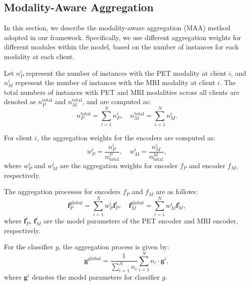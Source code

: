 \subsection{Modality-Aware Aggregation}

In this section, we describe the modality-aware aggregation (MAA) method adopted in our framework. Specifically, we use different aggregation weights for different modules within the model, based on the number of instances for each modality at each client.

Let \( n_P^i \) represent the number of instances with the PET modality at client \( i \), and \( n_M^i \) represent the number of instances with the MRI modality at client \( i \). The total numbers of instances with PET and MRI modalities across all clients are denoted as \( n^{\text{total}}_P \) and \( n^{\text{total}}_M \), and are computed as:
\begin{equation}
n^{\text{total}}_P = \sum_{i=1}^{N} n_P^i, \quad n^{\text{total}}_M = \sum_{i=1}^{N} n_M^i.    
\end{equation}

For client \( i \), the aggregation weights for the encoders are computed as:
\begin{equation}
w_P^i = \frac{n_P^i}{n_{\text{total}}^P}, \quad w_M^i = \frac{n_M^i}{n_{\text{total}}^M},
\end{equation}
where \( w_P^i \) and \( w_M^i \) are the aggregation weights for encoder $f_P$ and encoder $f_M$, respectively. 

The aggregation processes for encoders $f_P$ and $f_M$ are as follows:
\begin{equation}
    \mathbf{f}_P^{\text{global}} = \sum_{i=1}^{N} w_P^i \mathbf{f}_P^i, \quad
\mathbf{f}_M^{\text{global}} = \sum_{i=1}^{N} w_M^i \mathbf{f}_M^i,
\end{equation}
where \( \mathbf{f}_P^i \), \( \mathbf{f}_M^i \) are the model parameters of the PET encoder and MRI encoder, respectively.


For the classifier \( g \), the aggregation process is given by:
\begin{equation}
    \mathbf{g}^{\text{global}} = \frac{1}{\sum_{i=1}^{N}n_i}\sum_{i=1}^{N} n_i\cdot\mathbf{g}^i,
\end{equation}
where \( \mathbf{g}^i \) denotes the model parameters for classifier $g$.


               